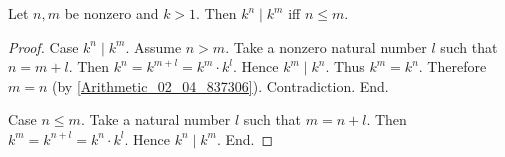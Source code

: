 \documentclass[../../arithmetic.ftl.tex]{subfiles}
\begin{document}
\begin{forthel}
    \begin{proposition}\label{Arithmetic_03_01_499003}
      Let $n,m$ be nonzero and $k > 1$.
      Then $k^{n} \mid k^{m}$ iff $n \leq m$.
    \end{proposition}
    \begin{proof}
      Case $k^{n} \mid k^{m}$.
        Assume $n > m$.
        Take a nonzero natural number $l$ such that $n = m + l$.
        Then $k^{n} = k^{m + l} = k^{m} \cdot k^{l}$.
        Hence $k^{m} \mid k^{n}$.
        Thus $k^{m} = k^{n}$.
        Therefore $m = n$ (by \ref{Arithmetic_02_04_837306}).
        Contradiction.
      End.

      Case $n \leq m$.
        Take a natural number $l$ such that $m = n + l$.
        Then $k^{m} = k^{n + l} = k^{n} \cdot k^{l}$.
        Hence $k^{n} \mid k^{m}$.
      End.
    \end{proof}
  \end{forthel}
\end{document}
